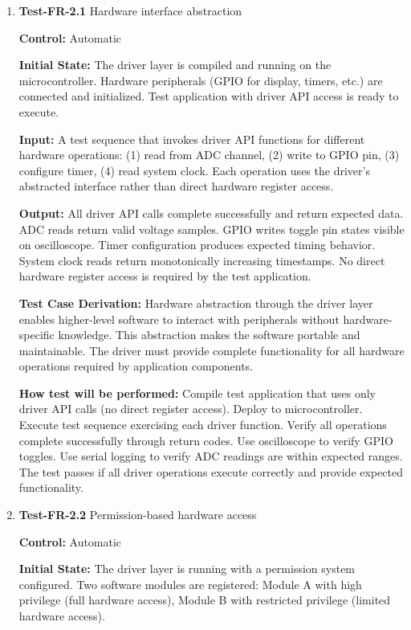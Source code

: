 \documentclass[12pt, titlepage]{article}
\begin{document}
\begin{enumerate}

\item{\textbf{Test-FR-2.1} Hardware interface abstraction \\}

\textbf{Control:} Automatic
					
\textbf{Initial State:} 
The driver layer is compiled and running on the microcontroller. Hardware
peripherals (GPIO for display, timers, etc.) are connected and initialized. Test
application with driver API access is ready to execute.
					
\textbf{Input:}
A test sequence that invokes driver API functions for different hardware
operations: (1) read from ADC channel, (2) write to GPIO pin, (3) configure
timer, (4) read system clock. Each operation uses the driver's abstracted
interface rather than direct hardware register access.
					
\textbf{Output:}
All driver API calls complete successfully and return expected data. ADC reads
return valid voltage samples. GPIO writes toggle pin states visible on
oscilloscope. Timer configuration produces expected timing behavior. System
clock reads return monotonically increasing timestamps. No direct hardware
register access is required by the test application.

\textbf{Test Case Derivation:} 
Hardware abstraction through the driver layer enables higher-level software to
interact with peripherals without hardware-specific knowledge. This abstraction
makes the software portable and maintainable. The driver must provide complete
functionality for all hardware operations required by application components.
					
\textbf{How test will be performed:}
Compile test application that uses only driver API calls (no direct register
access). Deploy to microcontroller. Execute test sequence exercising each driver
function. Verify all operations complete successfully through return codes. Use
oscilloscope to verify GPIO toggles. Use serial logging to verify ADC readings
are within expected ranges. The test passes if all driver operations execute
correctly and provide expected functionality.

\item{\textbf{Test-FR-2.2} Permission-based hardware access\\}

\textbf{Control:} Automatic
					
\textbf{Initial State:} 
The driver layer is running with a permission system configured. Two software
modules are registered: Module A with high privilege (full hardware access),
Module B with restricted privilege (limited hardware access).
					

\end{enumerate}
\end{document}
